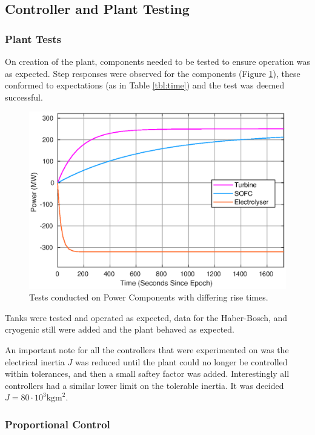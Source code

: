 \subsection{Controller and Plant Testing}
\label{sec:pwrtesting}

\subsubsection{Plant Tests}

On creation of the plant, components needed to be tested to ensure operation was as expected.
Step responses were observed for the components (Figure \ref{fig:power-risetime}), these conformed to expectations (as in Table \ref{tbl:time}) and the test was deemed successful.

\begin{figure}
    \centering
    \includegraphics[scale=0.5]{images/results/risetime.eps}
    \caption{Tests conducted on Power Components with differing rise times.}
    \label{fig:power-risetime}
\end{figure}

Tanks were tested and operated as expected, data for the Haber-Bosch, and cryogenic still were added and the plant behaved as expected.

An important note for all the controllers that were experimented on was the electrical inertia $J$ was reduced until the plant could no longer be controlled within tolerances, and then a small saftey factor was added.
Interestingly all controllers had a similar lower limit on the tolerable inertia.
It was decided $J = 80 \cdot 10^{3}\text{kgm}^{2}$.

\subsubsection{Proportional Control}


